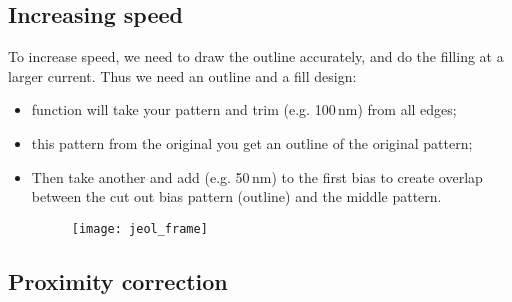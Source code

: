  \subsection{Increasing speed}
 To increase  speed, we need to  draw the outline accurately,  and do
 the filling at a larger current. Thus  we need an outline and a fill
 design:

 \begin{itemize}
 \item  {}   function  will   take  your  pattern   and  trim
   (e.g. 100\,nm) from all edges;
 \item {}  this pattern  from the original  \ira you  get an
   outline of the original pattern;
 \item Then  take another   and add  (e.g.  50\,nm)  to the
   first  bias to  create overlap  between the  cut out  bias pattern
   (outline)  and the  middle pattern.   \begin{figure}[h] \centering
     \texttt{[image: jeol\_frame]}
   \end{figure}

   \noindent
 \end{itemize}

 \subsection{Proximity correction}

